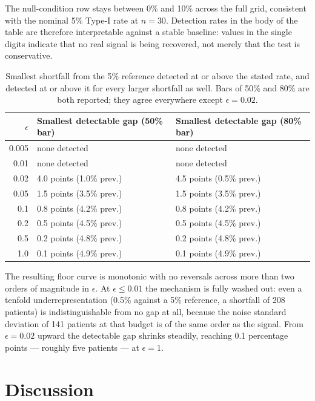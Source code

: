 \documentclass[11pt]{article}
\begin{document}
The null-condition row stays between 0\% and 10\% across the full grid, consistent with the nominal 5\% Type-I rate at $n = 30$. Detection rates in the body of the table are therefore interpretable against a stable baseline: values in the single digits indicate that no real signal is being recovered, not merely that the test is conservative.

\begin{table}[H]
\centering
\begin{tabular}{rll}
\toprule
$\epsilon$ & Smallest detectable gap (50\% bar) & Smallest detectable gap (80\% bar) \\
\midrule
0.005 & none detected            & none detected \\
0.01  & none detected            & none detected \\
0.02  & 4.0 points (1.0\% prev.) & 4.5 points (0.5\% prev.) \\
0.05  & 1.5 points (3.5\% prev.) & 1.5 points (3.5\% prev.) \\
0.1   & 0.8 points (4.2\% prev.) & 0.8 points (4.2\% prev.) \\
0.2   & 0.5 points (4.5\% prev.) & 0.5 points (4.5\% prev.) \\
0.5   & 0.2 points (4.8\% prev.) & 0.2 points (4.8\% prev.) \\
1.0   & 0.1 points (4.9\% prev.) & 0.1 points (4.9\% prev.) \\
\bottomrule
\end{tabular}
\caption{Smallest shortfall from the 5\% reference detected at or above the stated rate, and detected at or above it for every larger shortfall as well. Bars of 50\% and 80\% are both reported; they agree everywhere except $\epsilon = 0.02$.}
\label{tab:boundary}
\end{table}

The resulting floor curve is monotonic with no reversals across more than two orders of magnitude in $\epsilon$. At $\epsilon \leq 0.01$ the mechanism is fully washed out: even a tenfold underrepresentation (0.5\% against a 5\% reference, a shortfall of 208 patients) is indistinguishable from no gap at all, because the noise standard deviation of 141 patients at that budget is of the same order as the signal. From $\epsilon = 0.02$ upward the detectable gap shrinks steadily, reaching 0.1 percentage points --- roughly five patients --- at $\epsilon = 1$.

\section{Discussion}
\end{document}
